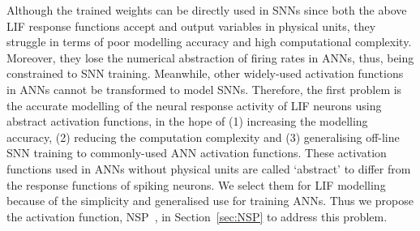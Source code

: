 	
	Although the trained weights can be directly used in SNNs since both the above LIF response functions accept and output variables in physical units, they struggle in terms of poor modelling accuracy and high computational complexity.
	Moreover, they lose the numerical abstraction of firing rates in ANNs, thus, being constrained to SNN training.
	Meanwhile, other widely-used activation functions in ANNs cannot be transformed to model SNNs.
	Therefore, the first problem is the accurate modelling of the neural response activity of LIF neurons	using abstract activation functions, in the hope of (1) increasing the modelling accuracy, (2) reducing the computation complexity and (3) generalising off-line SNN training to commonly-used ANN activation functions.
	These activation functions used in ANNs without physical units are called `abstract' to differ from the response functions of spiking neurons.
	We select them for LIF modelling because of the simplicity and generalised use for training ANNs.
	Thus we propose the activation function, NSP~\citep{liu2016noisy}, in Section~\ref{sec:NSP} to address this problem.
	
	
	
